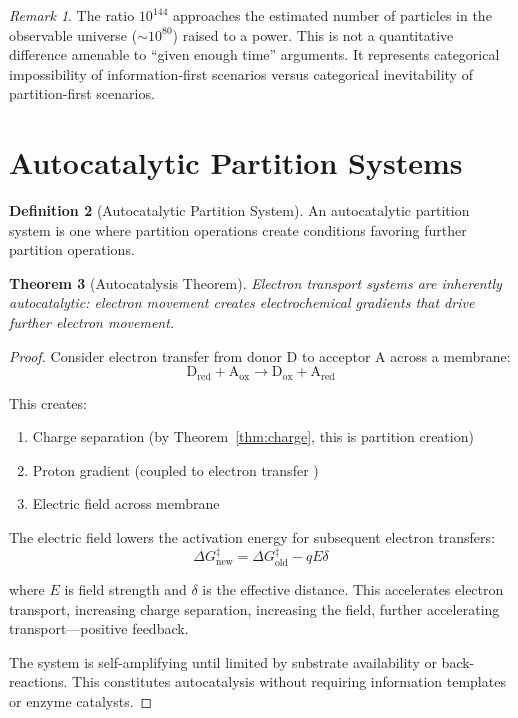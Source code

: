 \documentclass[twocolumn,10pt,a4paper]{article}
\newtheorem{theorem}{Theorem}[section]
\theoremstyle{definition}
\newtheorem{definition}[theorem]{Definition}
\theoremstyle{remark}
\newtheorem{remark}[theorem]{Remark}
\begin{document}
\begin{remark}
The ratio $10^{144}$ approaches the estimated number of particles in the observable universe ($\sim 10^{80}$) raised to a power. This is not a quantitative difference amenable to ``given enough time'' arguments. It represents categorical impossibility of information-first scenarios versus categorical inevitability of partition-first scenarios.
\end{remark}


\section{Autocatalytic Partition Systems}
\label{sec:autocatalysis}

\begin{definition}[Autocatalytic Partition System]
\label{def:autocatalytic}
An autocatalytic partition system is one where partition operations create conditions favoring further partition operations.
\end{definition}

\begin{theorem}[Autocatalysis Theorem]
\label{thm:autocatalysis}
Electron transport systems are inherently autocatalytic: electron movement creates electrochemical gradients that drive further electron movement.
\end{theorem}

\begin{proof}
Consider electron transfer from donor D to acceptor A across a membrane:
\begin{equation}
    \text{D}_{\text{red}} + \text{A}_{\text{ox}} \to \text{D}_{\text{ox}} + \text{A}_{\text{red}}
\end{equation}

This creates:
\begin{enumerate}
    \item Charge separation (by Theorem~\ref{thm:charge}, this is partition creation)
    \item Proton gradient (coupled to electron transfer \cite{mitchell1961})
    \item Electric field across membrane
\end{enumerate}

The electric field lowers the activation energy for subsequent electron transfers:
\begin{equation}
    \Delta G^{\ddagger}_{\text{new}} = \Delta G^{\ddagger}_{\text{old}} - qE\delta
\end{equation}

where $E$ is field strength and $\delta$ is the effective distance. This accelerates electron transport, increasing charge separation, increasing the field, further accelerating transport---positive feedback.

The system is self-amplifying until limited by substrate availability or back-reactions. This constitutes autocatalysis without requiring information templates or enzyme catalysts.
\end{proof}
\end{document}
